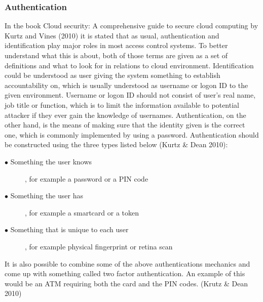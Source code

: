 \documentclass{article}
\begin{document}
\subsubsection{Authentication}
In the book Cloud security: A comprehensive guide to secure cloud computing by Kurtz and Vines (2010) it is stated that as usual, authentication and identification play major roles in most access control systems. To better understand what this is about, both of those terms are given as a set of definitions and what to look for in relations to cloud environment.
Identification could be understood as user giving the system something to establish accountability on, which is usually understood as username or logon ID to the given environment. Username or logon ID should not consist of user's real name, job title or function, which is to limit the information available to potential attacker if they ever gain the knowledge of usernames. Authentication, on the other hand, is the means of making sure that the identity given is the correct one, which is commonly implemented by using a password. Authentication should be constructed using the three types listed below (Kurtz \& Dean 2010):
\begin{description}
        \item[$\bullet$ Something the user knows], for example a password or a PIN code
        \item[$\bullet$ Something the user has], for example a smartcard or a token
        \item[$\bullet$ Something that is unique to each user], for example physical fingerprint or retina scan
\end{description}
It is also possible to combine some of the above authentications mechanics and come up with something called two factor authentication. An example of this would be an ATM requiring both the card and the PIN codes. (Krutz \& Dean 2010)
\end{document}
